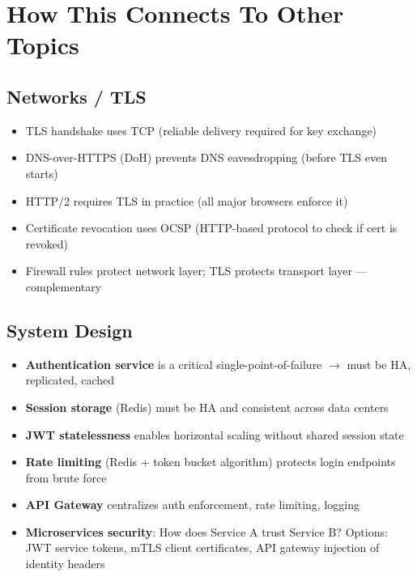 \documentclass[11pt]{article}
\providecommand{\tightlist}{\setlength{\itemsep}{1pt}\setlength{\parskip}{0pt}}
\begin{document}
\section{How This Connects To Other Topics}\label{how-this-connects-to-other-topics}

\subsection{Networks / TLS}\label{networks--tls}

\begin{itemize}
\tightlist
\item
  TLS handshake uses TCP (reliable delivery required for key exchange)
\item
  DNS-over-HTTPS (DoH) prevents DNS eavesdropping (before TLS even starts)
\item
  HTTP/2 requires TLS in practice (all major browsers enforce it)
\item
  Certificate revocation uses OCSP (HTTP-based protocol to check if cert is revoked)
\item
  Firewall rules protect network layer; TLS protects transport layer --- complementary
\end{itemize}

\subsection{System Design}\label{system-design}

\begin{itemize}
\tightlist
\item
  \textbf{Authentication service} is a critical single-point-of-failure \(\rightarrow\) must be HA, replicated, cached
\item
  \textbf{Session storage} (Redis) must be HA and consistent across data centers
\item
  \textbf{JWT statelessness} enables horizontal scaling without shared session state
\item
  \textbf{Rate limiting} (Redis + token bucket algorithm) protects login endpoints from brute force
\item
  \textbf{API Gateway} centralizes auth enforcement, rate limiting, logging
\item
  \textbf{Microservices security}: How does Service A trust Service B? Options: JWT service tokens, mTLS client certificates, API gateway injection of identity headers
\end{itemize}
\end{document}
